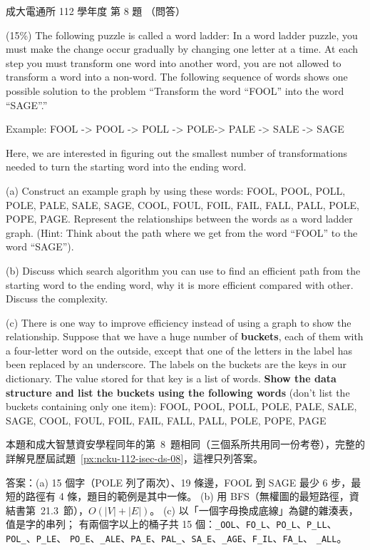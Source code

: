 \begin{pastexam}[label={px:ncku-112-cce-ds-08}]{成大電通所 112 學年度 第 8 題}
（問答）

(15\%) The following puzzle is called a word ladder: In a word ladder puzzle, you must make the
change occur gradually by changing one letter at a time. At each step you must transform one word
into another word, you are not allowed to transform a word into a non-word. The following sequence
of words shows one possible solution to the problem ``Transform the word ``FOOL'' into the word
``SAGE''.''

\hspace*{1em}Example: FOOL -> POOL -> POLL -> POLE-> PALE -> SALE -> SAGE

Here, we are interested in figuring out the smallest number of transformations needed to turn the
starting word into the ending word.

(a) Construct an example graph by using these words: FOOL, POOL, POLL, POLE, PALE, SALE, SAGE, COOL,
FOUL, FOIL, FAIL, FALL, PALL, POLE, POPE, PAGE. Represent the relationships between the words as a
word ladder graph. (Hint: Think about the path where we get from the word ``FOOL'' to the word
``SAGE'').

(b) Discuss which search algorithm you can use to find an efficient path from the starting word to
the ending word, why it is more efficient compared with other. Discuss the complexity.

(c) There is one way to improve efficiency instead of using a graph to show the relationship.
Suppose that we have a huge number of \textbf{buckets}, each of them with a four-letter word on the
outside, except that one of the letters in the label has been replaced by an underscore. The labels
on the buckets are the keys in our dictionary. The value stored for that key is a list of words.
\textbf{Show the data structure and list the buckets using the following words} (don't list the
buckets containing only one item): FOOL, POOL, POLL, POLE, PALE, SALE, SAGE, COOL, FOUL, FOIL, FAIL,
FALL, PALL, POLE, POPE, PAGE
\end{pastexam}

\begin{pastsoln}
本題和成大智慧資安學程同年的第~8~題相同（三個系所共用同一份考卷），完整的詳解見歷屆試題~\ref{px:ncku-112-isec-ds-08}，這裡只列答案。

答案：(a) 15 個字（POLE 列了兩次）、19 條邊，FOOL 到 SAGE 最少 6 步，最短的路徑有 4 條，題目的範例是其中一條。
(b) 用 BFS（無權圖的最短路徑，資結書第~21.3~節），$O(|V| + |E|)$。 (c) 以「一個字母換成底線」為鍵的雜湊表，值是字的串列；
有兩個字以上的桶子共 15 個：\texttt{\_OOL}、\texttt{FO\_L}、\texttt{PO\_L}、\texttt{P\_LL}、\texttt{POL\_}、\texttt{P\_LE}、
\texttt{PO\_E}、\texttt{\_ALE}、\texttt{PA\_E}、\texttt{PAL\_}、\texttt{SA\_E}、\texttt{\_AGE}、\texttt{F\_IL}、\texttt{FA\_L}、
\texttt{\_ALL}。
\end{pastsoln}
